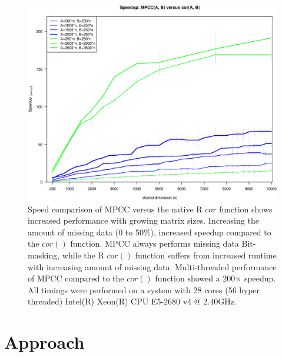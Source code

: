 \documentclass{bioinfo}
\begin{document}



\begin{figure}[H]
\centering
\includegraphics[width=\linewidth]{img/figure02new.eps}
  \caption{
  \small
    Speed comparison of MPCC versus the native R $cor$ function
    shows increased performance with growing matrix sizes. Increasing
    the amount of missing data (0 to 50\%), increased speedup compared 
    to the $cor()$ function. MPCC always performs missing data Bit-masking, 
    while the R $cor()$ function suffers from increased runtime with 
    increasing amount of missing data. Multi-threaded performance 
    of MPCC compared to the $cor()$ function showed a 200$\times$ speedup. 
    All timings were performed on a system with 28 cores (56 hyper 
    threaded) Intel(R) Xeon(R) CPU E5-2680 v4 @ 2.40GHz.
}
  \label{fig:fig2}
\end{figure}

\vspace*{-10mm}

\section{Approach}
\end{document}
